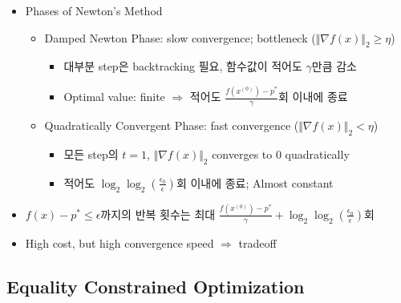 \begin{itemize}
    \item Phases of Newton's Method
    \begin{itemize}
        \item Damped Newton Phase: slow convergence; bottleneck ($\Vert\nabla f(x)\Vert_2\geq\eta$)
        \begin{itemize}
            \item 대부분 step은 backtracking 필요, 함수값이 적어도 $\gamma$만큼 감소
            \item Optimal value: finite $\Rightarrow$ 적어도 $\frac{f(x^{(0)})-p^\ast}{\gamma}$회 이내에 종료
        \end{itemize}
        \item Quadratically Convergent Phase: fast convergence ($\Vert\nabla f(x)\Vert_2<\eta$)
        \begin{itemize}
            \item 모든 step의 $t=1$, $\Vert\nabla f(x)\Vert_2$ converges to 0 quadratically
            \item 적어도 $\log_2\log_2\left(\frac{\epsilon_0}{\epsilon}\right)$회 이내에 종료; Almost constant
        \end{itemize}
    \end{itemize}
    \item $f(x)-p^\ast\leq\epsilon$까지의 반복 횟수는 최대 $\frac{f(x^{(0)})-p^\ast}{\gamma}+\log_2\log_2\left(\frac{\epsilon_0}{\epsilon}\right)$회
    \item High cost, but high convergence speed $\Rightarrow$ tradeoff
\end{itemize}

\subsection{Equality Constrained Optimization}

